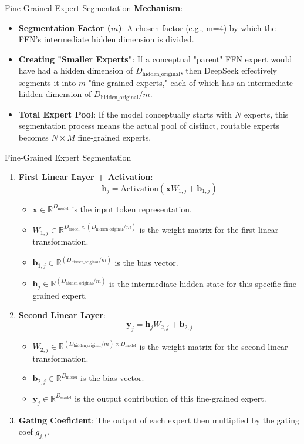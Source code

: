 \documentclass{beamer}
\begin{document}
\begin{frame}{Fine-Grained Expert Segmentation}
  \textbf{Mechanism}:
  \begin{itemize}
    \item \textbf{Segmentation Factor ($m$)}: A chosen factor (e.g., m=4) by which the FFN's 
    intermediate hidden dimension is divided. 
    \item \textbf{Creating "Smaller Experts"}: If a conceptual "parent" FFN expert would have had a hidden dimension of $D_{\text{hidden\_original}}$, then DeepSeek effectively segments it into $m$ "fine-grained experts," 
    each of which has an intermediate hidden dimension of $D_{\text{hidden\_original}}/m$.
    \item \textbf{Total Expert Pool}: If the model conceptually starts with $N$ experts, this segmentation process means 
    the actual pool of distinct, routable experts becomes $N \times M$ fine-grained experts.
  \end{itemize}
\end{frame}

\begin{frame}[allowframebreaks]{Fine-Grained Expert Segmentation}
  \begin{enumerate}
    \item \textbf{First Linear Layer + Activation}:
      $$ \mathbf{h}_j = \text{Activation}(\mathbf{x}W_{1,j} + \mathbf{b}_{1,j}) $$
      \begin{itemize}
          \item $\mathbf{x} \in \mathbb{R}^{D_{\text{model}}}$ is the input token representation.
          \item $W_{1,j} \in \mathbb{R}^{D_{\text{model}} \times (D_{\text{hidden\_original}}/m)}$ is the weight matrix for the first linear transformation.
          \item $\mathbf{b}_{1,j} \in \mathbb{R}^{(D_{\text{hidden\_original}}/m)}$ is the bias vector.
          \item $\mathbf{h}_j \in \mathbb{R}^{(D_{\text{hidden\_original}}/m)}$ is the intermediate hidden state for this specific fine-grained expert.
      \end{itemize}
    \item \textbf{Second Linear Layer}:
      $$ \mathbf{y}_j = \mathbf{h}_j W_{2,j} + \mathbf{b}_{2,j} $$
      \begin{itemize}
          \item $W_{2,j} \in \mathbb{R}^{(D_{\text{hidden\_original}}/m) \times D_{\text{model}}}$ is the weight matrix for the second linear transformation.
          \item $\mathbf{b}_{2,j} \in \mathbb{R}^{D_{\text{model}}}$ is the bias vector.
          \item $\mathbf{y}_j \in \mathbb{R}^{D_{\text{model}}}$ is the output contribution of this fine-grained expert.
      \end{itemize}
    \item \textbf{Gating Coeficient}: The output of each expert then multiplied by the gating coef $g_{j,t}$.
    $$  $$
  \end{enumerate}
\end{frame}
\end{document}
